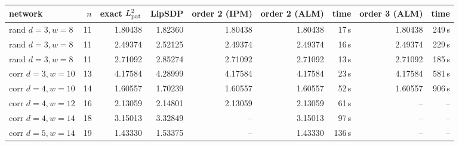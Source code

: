 \begin{tabular}{l r r r r r r r r}\toprule
network & $n$ & exact $L^2_{\rm pat}$ & LipSDP & order 2 (IPM) & order 2 (ALM) & time & order 3 (ALM) & time \\\midrule
rand $d{=}3,w{=}8$ & 11 & 1.80438 & 1.82360 & 1.80438 & 1.80438 & 17\,s & 1.80438 & 249\,s \\
rand $d{=}3,w{=}8$ & 11 & 2.49374 & 2.52125 & 2.49374 & 2.49374 & 16\,s & 2.49374 & 229\,s \\
rand $d{=}3,w{=}8$ & 11 & 2.71092 & 2.85274 & 2.71092 & 2.71092 & 13\,s & 2.71092 & 185\,s \\
corr $d{=}3,w{=}10$ & 13 & 4.17584 & 4.28999 & 4.17584 & 4.17584 & 23\,s & 4.17584 & 581\,s \\
corr $d{=}4,w{=}10$ & 14 & 1.60557 & 1.70239 & 1.60557 & 1.60557 & 52\,s & 1.60557 & 906\,s \\
corr $d{=}4,w{=}12$ & 16 & 2.13059 & 2.14801 & 2.13059 & 2.13059 & 61\,s & -- & -- \\
corr $d{=}4,w{=}14$ & 18 & 3.15013 & 3.32849 & -- & 3.15013 & 97\,s & -- & -- \\
corr $d{=}5,w{=}14$ & 19 & 1.43330 & 1.53375 & -- & 1.43330 & 136\,s & -- & -- \\
\bottomrule\end{tabular}
